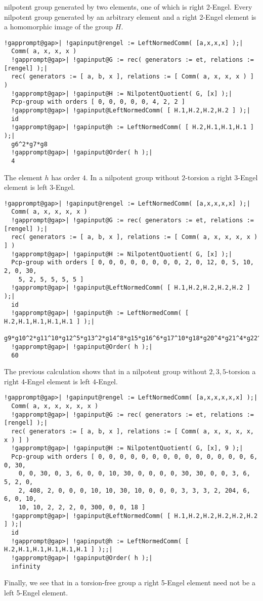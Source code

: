 \documentclass[a4paper,11pt]{report}
\begin{document}
{{nilpotent group generated by two elements, one of which is right 2-Engel.
Every nilpotent group generated by an arbitrary element and a right 2-Engel
element is a homomorphic image of the group $H$. 
\begin{Verbatim}[commandchars=!@|,fontsize=\small,frame=single,label=Example]
  !gapprompt@gap>| !gapinput@rengel := LeftNormedComm( [a,x,x,x] );|
  Comm( a, x, x, x )
  !gapprompt@gap>| !gapinput@G := rec( generators := et, relations := [rengel] );|
  rec( generators := [ a, b, x ], relations := [ Comm( a, x, x, x ) ] )
  !gapprompt@gap>| !gapinput@H := NilpotentQuotient( G, [x] );|
  Pcp-group with orders [ 0, 0, 0, 0, 0, 4, 2, 2 ]
  !gapprompt@gap>| !gapinput@LeftNormedComm( [ H.1,H.2,H.2,H.2 ] );|
  id
  !gapprompt@gap>| !gapinput@h := LeftNormedComm( [ H.2,H.1,H.1,H.1 ] );|
  g6^2*g7*g8
  !gapprompt@gap>| !gapinput@Order( h );|
  4
\end{Verbatim}
 The element $h$ has order $4$. In a nilpotent group without $2$-torsion a right 3-Engel element is left 3-Engel. 
\begin{Verbatim}[commandchars=!@|,fontsize=\small,frame=single,label=Example]
  !gapprompt@gap>| !gapinput@rengel := LeftNormedComm( [a,x,x,x,x] );|
  Comm( a, x, x, x, x )
  !gapprompt@gap>| !gapinput@G := rec( generators := et, relations := [rengel] );|
  rec( generators := [ a, b, x ], relations := [ Comm( a, x, x, x, x ) ] )
  !gapprompt@gap>| !gapinput@H := NilpotentQuotient( G, [x] );|
  Pcp-group with orders [ 0, 0, 0, 0, 0, 0, 0, 0, 2, 0, 12, 0, 5, 10, 2, 0, 30, 
    5, 2, 5, 5, 5, 5 ]
  !gapprompt@gap>| !gapinput@LeftNormedComm( [ H.1,H.2,H.2,H.2,H.2 ] );|
  id
  !gapprompt@gap>| !gapinput@h := LeftNormedComm( [ H.2,H.1,H.1,H.1,H.1 ] );|
  g9*g10^2*g11^10*g12^5*g13^2*g14^8*g15*g16^6*g17^10*g18*g20^4*g21^4*g22^2*g23^2
  !gapprompt@gap>| !gapinput@Order( h );|
  60
\end{Verbatim}
 The previous calculation shows that in a nilpotent group without $2,3,5$-torsion a right 4-Engel element is left 4-Engel. 
\begin{Verbatim}[commandchars=!@|,fontsize=\small,frame=single,label=Example]
  !gapprompt@gap>| !gapinput@rengel := LeftNormedComm( [a,x,x,x,x,x] );|
  Comm( a, x, x, x, x, x )
  !gapprompt@gap>| !gapinput@G := rec( generators := et, relations := [rengel] );|
  rec( generators := [ a, b, x ], relations := [ Comm( a, x, x, x, x, x ) ] )
  !gapprompt@gap>| !gapinput@H := NilpotentQuotient( G, [x], 9 );|
  Pcp-group with orders [ 0, 0, 0, 0, 0, 0, 0, 0, 0, 0, 0, 0, 0, 0, 6, 0, 30, 
    0, 0, 30, 0, 3, 6, 0, 0, 10, 30, 0, 0, 0, 0, 30, 30, 0, 0, 3, 6, 5, 2, 0, 
    2, 408, 2, 0, 0, 0, 10, 10, 30, 10, 0, 0, 0, 3, 3, 3, 2, 204, 6, 6, 0, 10, 
    10, 10, 2, 2, 2, 0, 300, 0, 0, 18 ]
  !gapprompt@gap>| !gapinput@LeftNormedComm( [ H.1,H.2,H.2,H.2,H.2,H.2 ] );|
  id
  !gapprompt@gap>| !gapinput@h := LeftNormedComm( [ H.2,H.1,H.1,H.1,H.1,H.1 ] );;|
  !gapprompt@gap>| !gapinput@Order( h );|
  infinity
\end{Verbatim}
 Finally, we see that in a torsion-free group a right 5-Engel element need not
be a left 5-Engel element. }

 }
\end{document}
